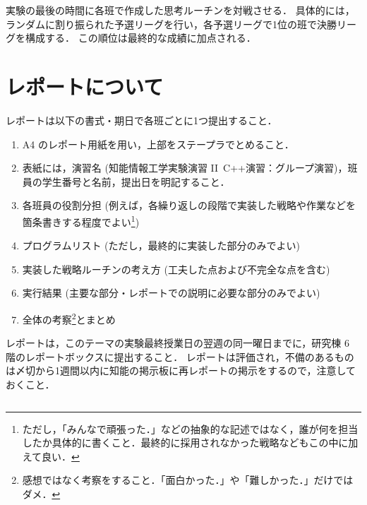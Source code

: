 実験の最後の時間に各班で作成した思考ルーチンを対戦させる．
具体的には，ランダムに割り振られた予選リーグを行い，各予選リーグで1位の班で決勝リーグを構成する．
この順位は最終的な成績に加点される．

\section{レポートについて}
レポートは以下の書式・期日で各班ごとに1つ提出すること．
\begin{enumerate}
 \item A4 のレポート用紙を用い，上部をステープラでとめること．\vspace*{-0.5em}
 \item 表紙には，演習名 (知能情報工学実験演習 II\ C++演習：グループ演習)，班員の学生番号と名前，提出日を明記すること．\vspace*{-0.5em}
 \item 各班員の役割分担 (例えば，各繰り返しの段階で実装した戦略や作業などを箇条書きする程度でよい\footnote{ただし，「みんなで頑張った．」などの抽象的な記述ではなく，誰が何を担当したか具体的に書くこと．最終的に採用されなかった戦略などもこの中に加えて良い．})\vspace*{-0.5em}
 \item プログラムリスト (ただし，最終的に実装した部分のみでよい)\vspace*{-0.5em}
 \item 実装した戦略ルーチンの考え方 (工夫した点および不完全な点を含む)\vspace*{-0.5em}
 \item 実行結果 (主要な部分・レポートでの説明に必要な部分のみでよい)\vspace*{-0.5em}
 \item 全体の考察\footnote{感想ではなく考察をすること．「面白かった．」や「難しかった．」だけではダメ．}とまとめ\vspace*{-0.5em}
 \end{enumerate}
レポートは，このテーマの実験最終授業日の翌週の同一曜日までに，研究棟 6 階のレポートボックスに提出すること．
レポートは評価され，不備のあるものは〆切から1週間以内に知能の掲示板に再レポートの掲示をするので，注意しておくこと．



\begin{quote}
\begin{verbatim}

\end{verbatim}
\end{quote}

